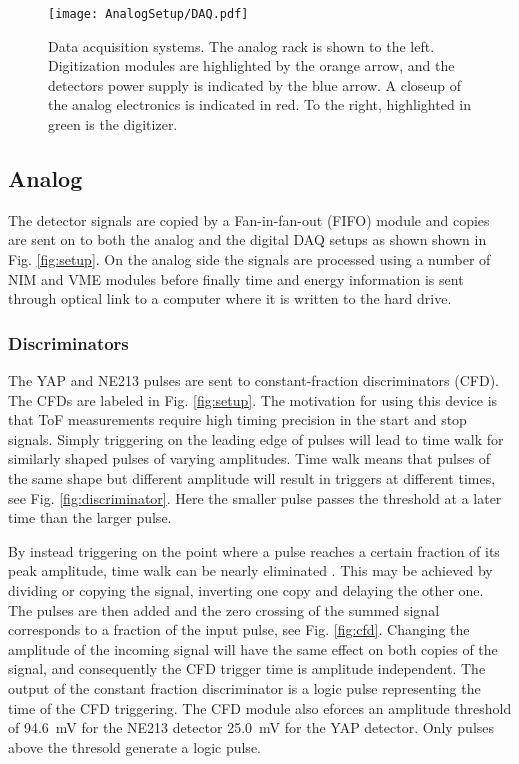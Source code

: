 \documentclass[main.tex]{subfiles}
\begin{document}
\begin{figure}[h]
    \centering
        \texttt{[image: AnalogSetup/DAQ.pdf]}
        \caption[Data acquisition systems.]{Data acquisition systems. The analog rack is shown to the left. Digitization modules are highlighted by the orange arrow, and the detectors power supply is indicated by the blue arrow. A closeup of the analog electronics is indicated in red. To the right, highlighted in green is the digitizer.}
    \label{fig:DAQ}
\end{figure}

\subsection{Analog}
The detector signals are copied by a Fan-in-fan-out (FIFO) module and copies are sent on to both the analog and the digital DAQ setups as shown shown in Fig. \ref{fig:setup}. On the analog side the signals are processed using a number of NIM and VME modules before finally time and energy information is sent through optical link to a computer where it is written to the hard drive. 

\subsubsection{Discriminators}
The YAP and NE213 pulses are sent to constant-fraction discriminators (CFD). The CFDs are labeled  in Fig. \ref{fig:setup}. The motivation for using this device is that ToF measurements require high timing precision in the start and stop signals. Simply triggering on the leading edge of pulses will lead to time walk for similarly shaped pulses of varying amplitudes. Time walk means that pulses of the same shape but different amplitude will result in triggers at different times, see Fig. \ref{fig:discriminator}. Here the smaller pulse passes the threshold at a later time than the larger pulse.

By instead triggering on the point where a pulse reaches a certain fraction of its peak amplitude, time walk can be nearly eliminated \cite{Leo}. This may be achieved by dividing or copying the signal, inverting one copy and delaying the other one. The pulses are then added and the zero crossing of the summed signal corresponds to a fraction of the input pulse, see Fig. \ref{fig:cfd}. Changing the amplitude of the incoming signal will have the same effect on both copies of the signal, and consequently the CFD trigger time is amplitude independent. The output of the constant fraction discriminator is a logic pulse representing the time of the CFD triggering. The CFD module also eforces an amplitude threshold of \SI{94.6}{mV} for the NE213 detector \SI{25.0}{mV} for the YAP detector. Only pulses above the thresold generate a logic pulse.
\end{document}
